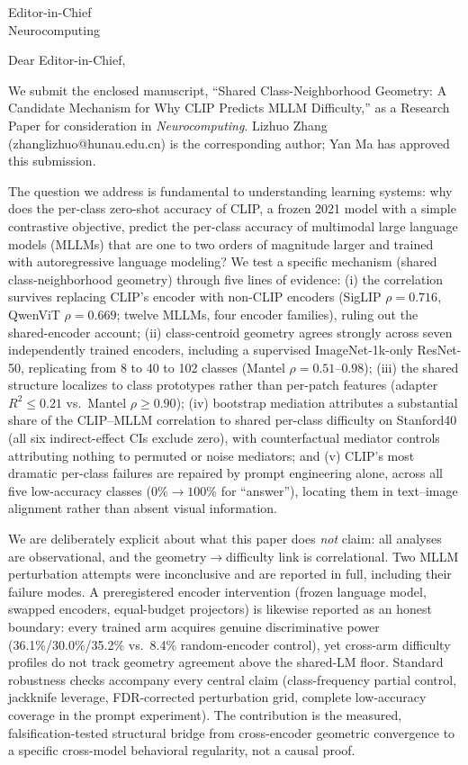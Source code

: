 \documentclass[10pt]{letter}
\begin{document}
\begin{letter}{Editor-in-Chief \\ Neurocomputing}

\opening{Dear Editor-in-Chief,}

We submit the enclosed manuscript, ``Shared Class-Neighborhood Geometry: A Candidate Mechanism for Why CLIP Predicts MLLM Difficulty,'' as a Research Paper for consideration in \emph{Neurocomputing}. Lizhuo Zhang (zhanglizhuo@hunau.edu.cn) is the corresponding author; Yan Ma has approved this submission.

The question we address is fundamental to understanding learning systems: why does the per-class zero-shot accuracy of CLIP, a frozen 2021 model with a simple contrastive objective, predict the per-class accuracy of multimodal large language models (MLLMs) that are one to two orders of magnitude larger and trained with autoregressive language modeling? We test a specific mechanism (shared class-neighborhood geometry) through five lines of evidence: (i) the correlation survives replacing CLIP's encoder with non-CLIP encoders (SigLIP $\rho=0.716$, QwenViT $\rho=0.669$; twelve MLLMs, four encoder families), ruling out the shared-encoder account; (ii) class-centroid geometry agrees strongly across seven independently trained encoders, including a supervised ImageNet-1k-only ResNet-50, replicating from 8 to 40 to 102 classes (Mantel $\rho=0.51$--$0.98$); (iii) the shared structure localizes to class prototypes rather than per-patch features (adapter $R^2\le0.21$ vs.\ Mantel $\rho\ge0.90$); (iv) bootstrap mediation attributes a substantial share of the CLIP--MLLM correlation to shared per-class difficulty on Stanford40 (all six indirect-effect CIs exclude zero), with counterfactual mediator controls attributing nothing to permuted or noise mediators; and (v) CLIP's most dramatic per-class failures are repaired by prompt engineering alone, across all five low-accuracy classes ($0\%\rightarrow100\%$ for ``answer''), locating them in text--image alignment rather than absent visual information.

We are deliberately explicit about what this paper does \emph{not} claim: all analyses are observational, and the geometry$\rightarrow$difficulty link is correlational. Two MLLM perturbation attempts were inconclusive and are reported in full, including their failure modes. A preregistered encoder intervention (frozen language model, swapped encoders, equal-budget projectors) is likewise reported as an honest boundary: every trained arm acquires genuine discriminative power (36.1\%/30.0\%/35.2\% vs.\ 8.4\% random-encoder control), yet cross-arm difficulty profiles do not track geometry agreement above the shared-LM floor. Standard robustness checks accompany every central claim (class-frequency partial control, jackknife leverage, FDR-corrected perturbation grid, complete low-accuracy coverage in the prompt experiment). The contribution is the measured, falsification-tested structural bridge from cross-encoder geometric convergence to a specific cross-model behavioral regularity, not a causal proof.


\end{letter}
\end{document}
